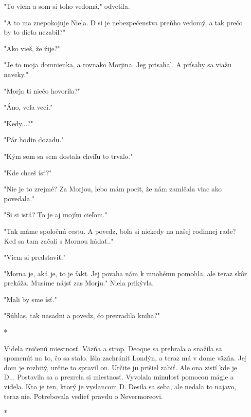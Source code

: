 \documentclass{book}
\begin{document}
"$ $To viem a som si toho vedomá,"$ $  odvetila.

"$ $A to ma znepokojuje Niela. D si je nebezpečenstva preňho vedomý, a tak prečo by to dieťa nezabil?"$ $ 

"$ $Ako vieš, že žije?"$ $ 

"$ $Je to moja domnienka, a rovnako Morjina. Jeg prisahal. A prísahy sa viažu naveky."$ $ 

"$ $Morja ti niečo hovorila?"$ $ 

"$ $Áno, veľa vecí."$ $ 

"$ $Kedy...?"$ $ 

"$ $Pár hodín dozadu."$ $ 

"$ $Kým som sa sem dostala chvíľu to trvalo."$ $ 

"$ $Kde chceš ísť?"$ $ 

"$ $Nie je to zrejmé? Za Morjou, lebo mám pocit, že nám zamlčala viac ako povedala."$ $ 

"$ $Si si istá? To je aj mojím cieľom."$ $ 

"$ $Tak máme spoločnú cestu. A povedz, bola si niekedy na našej rodinnej rade? Keď sa tam začali s Mornou hádať.."$ $ 

"$ $Viem si predstaviť."$ $ 

"$ $Morna je, aká je, to je fakt. Jej povaha nám k mnohému pomohla, ale teraz skôr prekáža. Musíme nájsť zas Morju."$ $  Niela prikývla.

"$ $Mali by sme ísť."$ $ 

"$ $Súhlas, tak nasadni a povedz, čo prezradila kniha?"$ $ 

\begin{center}

*

\end{center}

 Videla zničenú miestnosť. Väzňa a strop. Deoque sa prebrala a snažila sa spomenúť na to, čo sa stalo. Išla zachrániť Londýn, a teraz má v dome väzňa. Jej dom je rozbitý, určite to spravil on. Určite ju prišiel zabiť. Ale ona zistí kde je D... Postavila sa a prezrela si miestnosť. Vyvolala minulosť pomocou mágie a videla. Kto je ten, ktorý je vyslancom D. Desila sa seba, ale nedala to najavo, teraz nie. Potrebovala vedieť pravdu o Nevermoreovi.

\begin{center}

*

\end{center}
\end{document}
